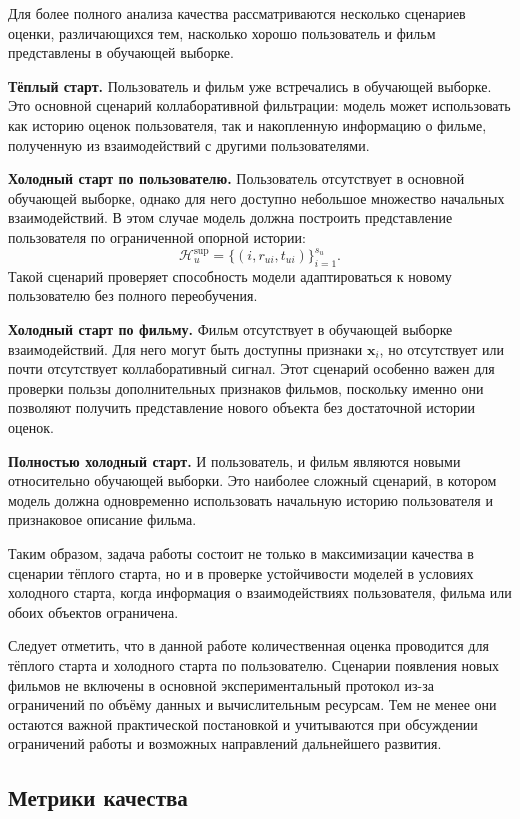 \documentclass[12pt,fleqn]{article}
\begin{document}
Для более полного анализа качества рассматриваются несколько сценариев оценки,
различающихся тем, насколько хорошо пользователь и фильм представлены в
обучающей выборке.

\textbf{Тёплый старт.} Пользователь и фильм уже встречались в обучающей выборке.
Это основной сценарий коллаборативной фильтрации: модель может использовать как
историю оценок пользователя, так и накопленную информацию о фильме, полученную
из взаимодействий с другими пользователями.

\textbf{Холодный старт по пользователю.} Пользователь отсутствует в основной
обучающей выборке, однако для него доступно небольшое множество начальных
взаимодействий. В этом случае модель должна построить представление пользователя
по ограниченной опорной истории:
$$
    \mathcal{H}^{\mathrm{sup}}_u=
    \{(i,r_{ui},t_{ui})\}_{i=1}^{s_u}.
$$
Такой сценарий проверяет способность модели адаптироваться к новому
пользователю без полного переобучения.

\textbf{Холодный старт по фильму.} Фильм отсутствует в обучающей выборке
взаимодействий. Для него могут быть доступны признаки $\mathbf{x}_i$, но
отсутствует или почти отсутствует коллаборативный сигнал. Этот сценарий
особенно важен для проверки пользы дополнительных признаков фильмов, поскольку
именно они позволяют получить представление нового объекта без достаточной
истории оценок.

\textbf{Полностью холодный старт.} И пользователь, и фильм являются новыми
относительно обучающей выборки. Это наиболее сложный сценарий, в котором модель
должна одновременно использовать начальную историю пользователя и признаковое
описание фильма.

Таким образом, задача работы состоит не только в максимизации качества в
сценарии тёплого старта, но и в проверке устойчивости моделей в условиях
холодного старта, когда информация о взаимодействиях пользователя, фильма или
обоих объектов ограничена.

Следует отметить, что в данной работе количественная оценка проводится для тёплого старта и
холодного старта по пользователю. Сценарии появления новых фильмов не включены
в основной экспериментальный протокол из-за ограничений по объёму данных и
вычислительным ресурсам. Тем не менее они остаются важной практической
постановкой и учитываются при обсуждении ограничений работы и возможных
направлений дальнейшего развития.

\subsection{Метрики качества}
\label{subsec:metrics}
\end{document}
